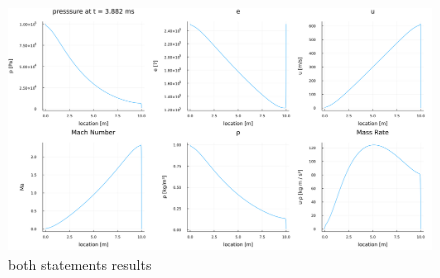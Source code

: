 \documentclass{article}
\begin{document}
\begin{figure}[H]
	\centering
	\includegraphics[width=\textwidth]{./figs/both_statements.png}
	\caption{both statements results}
	\label{both}
\end{figure}
\end{document}
